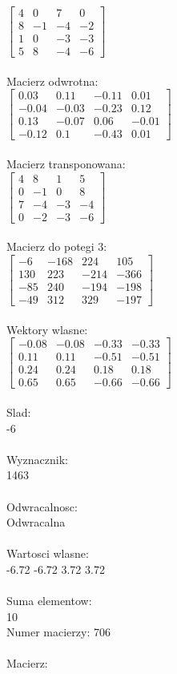 \documentclass[a4paper,12pt]{article}
\begin{document}
$\begin{bmatrix} 4&0&7&0\\8&-1&-4&-2\\1&0&-3&-3\\5&8&-4&-6 \end{bmatrix}$
\\
\\
Macierz odwrotna:\\

$\begin{bmatrix} 0.03&0.11&-0.11&0.01\\-0.04&-0.03&-0.23&0.12\\0.13&-0.07&0.06&-0.01\\-0.12&0.1&-0.43&0.01 \end{bmatrix}$
\\
\\
Macierz transponowana:\\

$\begin{bmatrix} 4&8&1&5\\0&-1&0&8\\7&-4&-3&-4\\0&-2&-3&-6 \end{bmatrix}$
\\
\\
Macierz do potegi 3:\\

$\begin{bmatrix} -6&-168&224&105\\130&223&-214&-366\\-85&240&-194&-198\\-49&312&329&-197 \end{bmatrix}$
\\
\\
Wektory wlasne:\\

$\begin{bmatrix} -0.08&-0.08&-0.33&-0.33\\0.11&0.11&-0.51&-0.51\\0.24&0.24&0.18&0.18\\0.65&0.65&-0.66&-0.66 \end{bmatrix}$
\\
\\
Slad:\\
-6
\\
\\
Wyznacznik:\\
1463
\\
\\
Odwracalnosc:\\
Odwracalna
\\
\\
Wartosci wlasne:\\
-6.72 -6.72 3.72 3.72
\\
\\
Suma elementow:\\
10
\\
\newpage
Numer macierzy:
706
\\
\\
Macierz:\\
\end{document}
